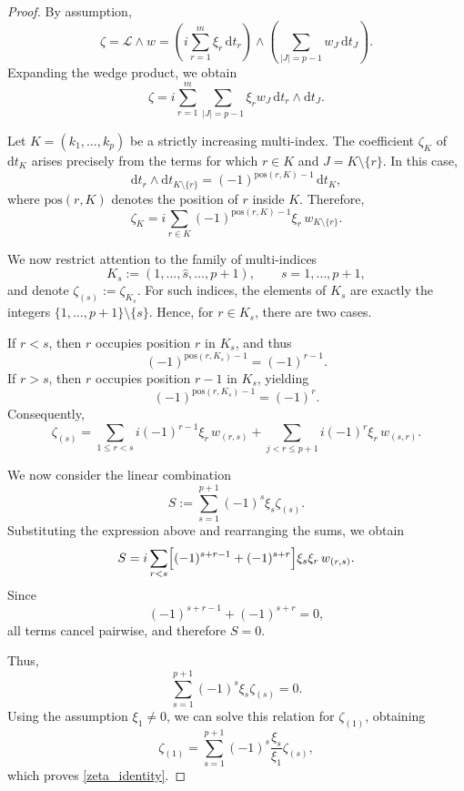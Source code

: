 \documentclass[12pt,reqno]{amsart}
\theoremstyle{definition}
\numberwithin{equation}{section}
\begin{document}
\begin{proof}
	By assumption,
	\[
	\zeta =	\mathscr L \wedge w = 	\left( i\sum_{r=1}^m \xi_r\,\mathrm dt_r \right)
	\wedge 	\left( \sum_{|J|=p-1} w_J\,\mathrm dt_J \right).
	\]
	Expanding the wedge product, we obtain
	\[
	\zeta 	= 	i\sum_{r=1}^m \sum_{|J|=p-1}  \xi_r w_J \, 	\mathrm dt_r \wedge \mathrm dt_J.
	\]
	
	Let $K=(k_1,\dots,k_p)$ be a strictly increasing multi-index.
	The coefficient $\zeta_K$ of $\mathrm dt_K$ arises precisely from the terms
	for which $r\in K$ and $J=K\setminus\{r\}$.
	In this case,
	\[
	\mathrm dt_r \wedge \mathrm dt_{K\setminus\{r\}} 	=
	(-1)^{\mathrm{pos}(r,K)-1}\,\mathrm dt_K,
	\]
	where $\mathrm{pos}(r,K)$ denotes the position of $r$ inside $K$.
	Therefore,
	\[
	\zeta_K 	= 	i\sum_{r\in K} (-1)^{\mathrm{pos}(r,K)-1} \xi_r\, w_{K\setminus\{r\}}.
	\]
	
	We now restrict attention to the family of multi-indices
	\[
	K_s := (1,\dots,\widehat s,\dots,p+1), 	\qquad s=1,\dots,p+1,
	\]
	and denote $\zeta_{(s)}:=\zeta_{K_s}$.
	For such indices, the elements of $K_s$ are exactly the integers
	$\{1,\dots,p+1\}\setminus\{s\}$.
	Hence, for $r\in K_s$, there are two cases.
	
	If $r<s$, then $r$ occupies position $r$ in $K_s$, and thus
	\[
	(-1)^{\mathrm{pos}(r,K_s)-1}=(-1)^{r-1}.
	\]
	If $r>s$, then $r$ occupies position $r-1$ in $K_s$, yielding
	\[
	(-1)^{\mathrm{pos}(r,K_s)-1}=(-1)^{r}.
	\]
	Consequently,
	\[
	\zeta_{(s)} = \sum_{1\le r<s} i(-1)^{r-1}\xi_r\, w_{(r,s)} 	+
	\sum_{j<r\le p+1} i(-1)^{r}\xi_r\, w_{(s,r)}.
	\]
	
	We now consider the linear combination
	\[
	S := \sum_{s=1}^{p+1} (-1)^s \xi_s \zeta_{(s)}.
	\]
	Substituting the expression above and rearranging the sums, we obtain
	\[
	S = i\sum_{r<s} \Bigl[ (-1)^{s+r-1} + (-1)^{s+r} \Bigr] \xi_s\xi_r\, w_{(r,s)}. 
	\]
	Since
	\[
	(-1)^{s+r-1} + (-1)^{s+r} = 0,
	\]
	all terms cancel pairwise, and therefore $S=0$.
	
	Thus,
	\[
	\sum_{s=1}^{p+1} (-1)^s \xi_s \zeta_{(s)} = 0.
	\]
	Using the assumption $\xi_1\neq 0$, we can solve this relation for
	$\zeta_{(1)}$, obtaining
	\[
	\zeta_{(1)} = \sum_{s=1}^{p+1} (-1)^s \frac{\xi_s}{\xi_1} \zeta_{(s)},
	\]
	which proves \eqref{zeta_identity}.
\end{proof}
\end{document}
